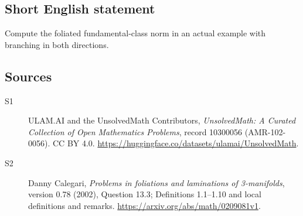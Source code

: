 \documentclass[11pt]{article}
\begin{document}
\subsection{Short English statement}
Compute the foliated fundamental-class norm in an actual example with branching in both directions.
\subsection{Sources}
\begin{description}
\item[\hypertarget{source:10300056:1}{S1}] ULAM.AI and the UnsolvedMath Contributors, \emph{UnsolvedMath: A Curated Collection of Open Mathematics Problems}, record 10300056 (AMR-102-0056). CC BY 4.0. \url{https://huggingface.co/datasets/ulamai/UnsolvedMath}.
\item[\hypertarget{source:10300056:2}{S2}] Danny Calegari, \emph{Problems in foliations and laminations of 3-manifolds}, version 0.78 (2002), Question 13.3; Definitions 1.1--1.10 and local definitions and remarks. \url{https://arxiv.org/abs/math/0209081v1}.
\end{description}
\label{end:10300056}
\end{document}
